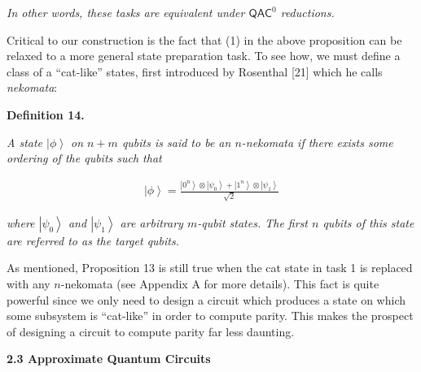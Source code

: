 \documentclass[10pt,a4paper]{article}
\begin{document}
\emph{In other words, these tasks are equivalent under ${\mathsf{QAC}}^{0}$ reductions.}\par






Critical to our construction is the fact that (1) in the above proposition can be relaxed to a more general state preparation task. To see how, we must define a class of a “cat-like” states, first introduced by Rosenthal [21] which he calls \emph{nekomata}:\par





\par\medskip\noindent\textbf{
\textbf{Definition 14}\textbf{.}
}\par



\emph{A state $\left|\phi\right\rangle$ on $n+m$ qubits is said to be an $n$-nekomata if there exists some ordering of the qubits such that}\par


\[\begin{gathered}
\displaystyle\left|\phi\right\rangle=\frac{\left|0^{n}\right\rangle\otimes\left|\psi_{0}\right\rangle+\left|1^{n}\right\rangle\otimes\left|\psi_{1}\right\rangle}{\sqrt{2}}
\end{gathered}\]


\emph{where $\left|\psi_{0}\right\rangle$ and $\left|\psi_{1}\right\rangle$ are arbitrary $m$-qubit states. The first $n$ qubits of this state are referred to as the target qubits.}\par






As mentioned, Proposition 13 is still true when the cat state in task 1 is replaced with any $n$-nekomata (see Appendix A for more details). This fact is quite powerful since we only need to design a circuit which produces a state on which some subsystem is “cat-like” in order to compute parity. This makes the prospect of designing a circuit to compute parity far less daunting.\par





\par\medskip\noindent\textbf{
2.3 Approximate Quantum Circuits}\par
\end{document}
